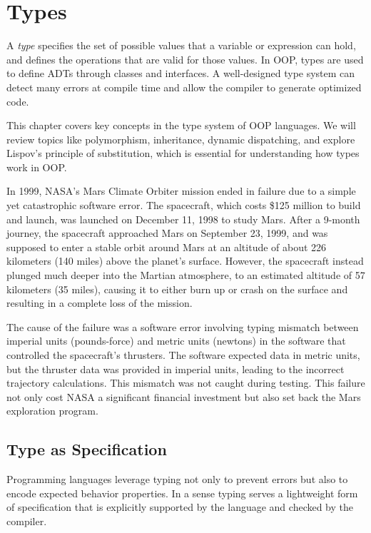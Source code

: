 \documentclass[oneside,11pt,dvipsnames]{book}
\newenvironment{historybox}[1][]{
  \small
  \begin{myhistorybox}
    {\small \textbf{#1}}
  }{
  \end{myhistorybox}
}
\begin{document}
\chapter{Types}\label{chap:types}

A \emph{type} specifies the set of possible values that a variable or expression can hold, and defines the operations that are valid for those values. In OOP, types are used to define ADTs through classes and interfaces. A well-designed type system can detect many errors at compile time and allow the compiler to generate optimized code.

This chapter covers key concepts in the type system of OOP languages. We will review topics like polymorphism, inheritance, dynamic dispatching, and explore Lispov's principle of substitution, which is essential for understanding how types work in OOP.

\begin{historybox}
In 1999, NASA's Mars Climate Orbiter mission ended in failure due to a simple yet catastrophic software error. The spacecraft, which costs \$125 million to build and launch, was launched on December 11, 1998 to study Mars. After a 9-month journey, the spacecraft approached Mars on September 23, 1999, and was supposed to enter a stable orbit around Mars at an altitude of about 226 kilometers (140 miles) above the planet’s surface. However, the spacecraft instead plunged much deeper into the Martian atmosphere, to an estimated altitude of 57 kilometers (35 miles), causing it to either burn up or crash on the surface and resulting in a complete loss of the mission.

The cause of the failure was a software error involving typing mismatch between imperial units (pounds-force) and metric units (newtons) in the software that controlled the spacecraft's thrusters. The software expected data in metric units, but the thruster data was provided in imperial units, leading to the incorrect trajectory calculations. This mismatch was not caught during testing. This failure not only cost NASA a significant financial investment but also set back the Mars exploration program. 
\end{historybox}

\section{Type as Specification}

Programming languages leverage typing not only to prevent errors but also to encode expected behavior properties. In a sense typing serves a lightweight form of specification that is explicitly supported by the language and checked by the compiler.
\end{document}
